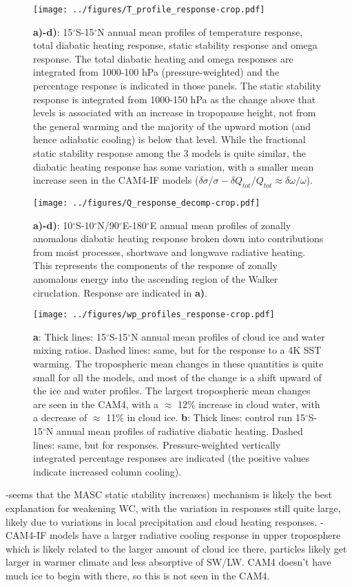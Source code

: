 \documentclass[letterpaper,12pt,titlepage,oneside,final]{book}
\begin{document}
\begin{figure}[H]
\centering
\noindent\texttt{[image: ../figures/T\_profile\_response-crop.pdf]}\hfill
\caption{\textbf{a)-d)}: 15$^\circ$S-15$^\circ$N annual mean profiles of temperature response, total diabatic heating response, static stability response and omega response. The total diabatic heating and omega responses are integrated from 1000-100 hPa (pressure-weighted) and the percentage response is indicated in those panels. The static stability response is integrated from 1000-150 hPa as the change above that levels is associated with an increase in tropopause height, not from the general warming and the majority of the upward motion (and hence adiabatic cooling) is below that level. While the fractional static stability response among the 3 models is quite similar, the diabatic heating response has some variation, with a smaller mean increase seen in the CAM4-IF models ($\delta{\sigma}/\sigma - \delta{Q_{tot}}/Q_{tot} \approx \delta{\omega}/\omega$).}
\end{figure}

\begin{figure}[H]
\centering
\noindent\texttt{[image: ../figures/Q\_response\_decomp-crop.pdf]}\hfill
\caption{\textbf{a)-d)}: 10$^\circ$S-10$^\circ$N/90$^\circ$E-180$^\circ$E annual mean profiles of zonally anomalous diabatic heating response broken down into contributions from moist processes, shortwave and longwave radiative heating. This represents the components of the response of zonally anomalous energy into the ascending region of the Walker ciruclation. Response are indicated in \textbf{a)}.}

\end{figure}

\begin{figure}[H]
\centering
\noindent\texttt{[image: ../figures/wp\_profiles\_response-crop.pdf]}\hfill
\caption{\textbf{a}: Thick lines: 15$^\circ$S-15$^\circ$N annual mean profiles of cloud ice and water mixing ratios. Dashed lines: same, but for the response to a 4K SST warming. The tropospheric mean changes in these quantities is quite small for all the models, and most of the change is a shift upward of the ice and water profiles. The largest tropospheric mean changes are seen in the CAM4, with a $\approx$ 12\% increase in cloud water, with a decrease of $\approx$ 11\% in cloud ice. \textbf{b}: Thick lines: control run 15$^\circ$S-15$^\circ$N annual mean profiles of radiative diabatic heating. Dashed lines: same, but for responses. Pressure-weighted vertically integrated percentage responses are indicated (the positive values indicate increased column cooling).}
\end{figure}
-seems that the MASC static stability increases) mechanism is likely the best explanation for weakening WC, with the variation in responses still quite large, likely due to variations in local precipitation and cloud heating responses. 
-CAM4-IF models have a larger radiative cooling response in upper troposphere which is likely related to the larger amount of cloud ice there, particles likely get larger in warmer climate and less absorptive of SW/LW. CAM4 doesn't have much ice to begin with there, so this is not seen in the CAM4.
\end{document}
